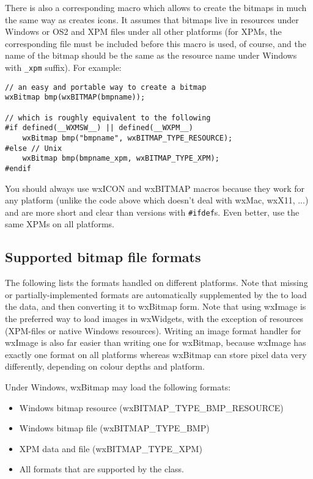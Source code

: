 There is also a corresponding  macro which allows
to create the bitmaps in much the same way as  creates
icons. It assumes that bitmaps live in resources under Windows or OS2 and XPM
files under all other platforms (for XPMs, the corresponding file must be
included before this macro is used, of course, and the name of the bitmap
should be the same as the resource name under Windows with {\tt \_xpm}
suffix). For example:

\begin{verbatim}
// an easy and portable way to create a bitmap
wxBitmap bmp(wxBITMAP(bmpname));

// which is roughly equivalent to the following
#if defined(__WXMSW__) || defined(__WXPM__)
    wxBitmap bmp("bmpname", wxBITMAP_TYPE_RESOURCE);
#else // Unix
    wxBitmap bmp(bmpname_xpm, wxBITMAP_TYPE_XPM);
#endif
\end{verbatim}

You should always use wxICON and wxBITMAP macros because they work for any
platform (unlike the code above which doesn't deal with wxMac, wxX11, ...) and
are more short and clear than versions with {\tt \#ifdef}s. Even better,
use the same XPMs on all platforms.

\subsection{Supported bitmap file formats}\label{supportedbitmapformats}

The following lists the formats handled on different platforms. Note
that missing or partially-implemented formats are automatically supplemented
by the  to load the data, and then converting
it to wxBitmap form. Note that using wxImage is the preferred way to
load images in wxWidgets, with the exception of resources (XPM-files or
native Windows resources). Writing an image format handler for wxImage
is also far easier than writing one for wxBitmap, because wxImage has
exactly one format on all platforms whereas wxBitmap can store pixel data
very differently, depending on colour depths and platform.


Under Windows, wxBitmap may load the following formats:

\begin{itemize}\itemsep=0pt
\item Windows bitmap resource (wxBITMAP\_TYPE\_BMP\_RESOURCE)
\item Windows bitmap file (wxBITMAP\_TYPE\_BMP)
\item XPM data and file (wxBITMAP\_TYPE\_XPM)
\item All formats that are supported by the  class.
\end{itemize}

